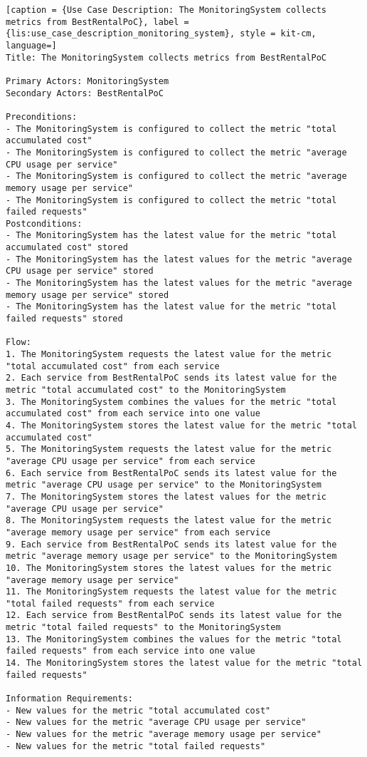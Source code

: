 \vspace{0.5cm}
\begin{lstlisting}[caption = {Use Case Description: The MonitoringSystem collects metrics from BestRentalPoC}, label = {lis:use_case_description_monitoring_system}, style = kit-cm, language=] 
Title: The MonitoringSystem collects metrics from BestRentalPoC

Primary Actors: MonitoringSystem
Secondary Actors: BestRentalPoC

Preconditions:
- The MonitoringSystem is configured to collect the metric "total accumulated cost"
- The MonitoringSystem is configured to collect the metric "average CPU usage per service"
- The MonitoringSystem is configured to collect the metric "average memory usage per service"
- The MonitoringSystem is configured to collect the metric "total failed requests"
Postconditions:
- The MonitoringSystem has the latest value for the metric "total accumulated cost" stored
- The MonitoringSystem has the latest values for the metric "average CPU usage per service" stored
- The MonitoringSystem has the latest values for the metric "average memory usage per service" stored
- The MonitoringSystem has the latest value for the metric "total failed requests" stored

Flow:
1. The MonitoringSystem requests the latest value for the metric "total accumulated cost" from each service
2. Each service from BestRentalPoC sends its latest value for the metric "total accumulated cost" to the MonitoringSystem
3. The MonitoringSystem combines the values for the metric "total accumulated cost" from each service into one value
4. The MonitoringSystem stores the latest value for the metric "total accumulated cost"
5. The MonitoringSystem requests the latest value for the metric "average CPU usage per service" from each service
6. Each service from BestRentalPoC sends its latest value for the metric "average CPU usage per service" to the MonitoringSystem
7. The MonitoringSystem stores the latest values for the metric "average CPU usage per service"
8. The MonitoringSystem requests the latest value for the metric "average memory usage per service" from each service
9. Each service from BestRentalPoC sends its latest value for the metric "average memory usage per service" to the MonitoringSystem
10. The MonitoringSystem stores the latest values for the metric "average memory usage per service"
11. The MonitoringSystem requests the latest value for the metric "total failed requests" from each service
12. Each service from BestRentalPoC sends its latest value for the metric "total failed requests" to the MonitoringSystem
13. The MonitoringSystem combines the values for the metric "total failed requests" from each service into one value
14. The MonitoringSystem stores the latest value for the metric "total failed requests"
	
Information Requirements: 
- New values for the metric "total accumulated cost"
- New values for the metric "average CPU usage per service"
- New values for the metric "average memory usage per service"
- New values for the metric "total failed requests"
\end{lstlisting}